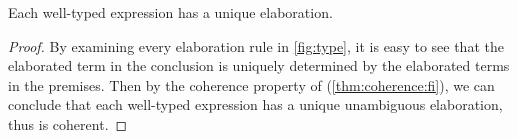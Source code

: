 \begin{theorem}[Coherence] Each well-typed \sedel expression has a unique elaboration.
\end{theorem}
\begin{proof}
  By examining every elaboration rule in \cref{fig:type}, it is easy to see that the elaborated
  \fnamee term in the conclusion is uniquely determined by the elaborated \fnamee
  terms in the premises. Then by the coherence property of \fnamee (\cref{thm:coherence:fi}), we can conclude
  that each well-typed \sedel expression has a unique unambiguous elaboration,
  thus \sedel is coherent.
\end{proof}

